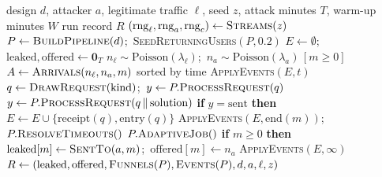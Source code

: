 \begin{algorithmic}[1]
\REQUIRE design $d$, attacker $a$, legitimate traffic $\ell$, seed $z$, attack minutes $T$, warm-up minutes $W$
\ENSURE run record $R$
\STATE $(\mathrm{rng}_\ell, \mathrm{rng}_a, \mathrm{rng}_c) \gets \textsc{Streams}(z)$
\STATE $P \gets \textsc{BuildPipeline}(d)$;\ \textsc{SeedReturningUsers}$(P, 0.2)$
\STATE $E \gets \emptyset$;\ $\mathrm{leaked}, \mathrm{offered} \gets \mathbf{0}_T$
\STATE $n_\ell \sim \mathrm{Poisson}(\lambda_\ell)$;\ $n_a \sim \mathrm{Poisson}(\lambda_a)\,[m \ge 0]$
\STATE $A \gets \textsc{Arrivals}(n_\ell, n_a, m)$ sorted by time
\STATE \textsc{ApplyEvents}$(E, t)$
\STATE $q \gets \textsc{DrawRequest}(\mathrm{kind})$;\ $y \gets P.\textsc{ProcessRequest}(q)$
\STATE $y \gets P.\textsc{ProcessRequest}(q \,\|\, \mathrm{solution})$
\ENDIF
\STATE \textbf{if} $y = \mathrm{sent}$ \textbf{then} $E \gets E \cup \{\mathrm{receipt}(q), \mathrm{entry}(q)\}$
\ENDFOR
\STATE \textsc{ApplyEvents}$(E, \mathrm{end}(m))$;\ $P.\textsc{ResolveTimeouts}()$
\STATE $P.\textsc{AdaptiveJob}()$
\STATE \textbf{if} $m \ge 0$ \textbf{then} $\mathrm{leaked}[m] \gets \textsc{SentTo}(a, m)$;\ $\mathrm{offered}[m] \gets n_a$
\ENDFOR
\STATE \textsc{ApplyEvents}$(E, \infty)$
\RETURN $R \gets (\mathrm{leaked}, \mathrm{offered}, \textsc{Funnels}(P), \textsc{Events}(P), d, a, \ell, z)$
\end{algorithmic}

